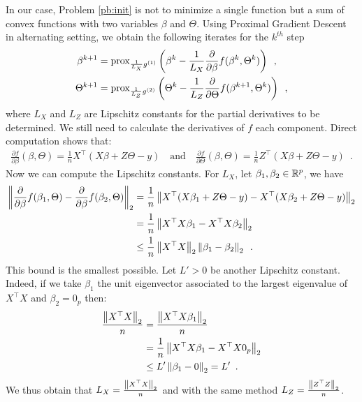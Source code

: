 \documentclass[../main.tex]{subfiles}
\begin{document}
In our case, Problem \eqref{pb:init} is not to minimize a single function but a sum of
convex functions with two variables $\beta$ and $\Theta$.
Using Proximal Gradient Descent \citep{Beck17} in alternating setting,
we obtain the following iterates for the $k^{th}$ step
\begin{align}
	\beta^{k+1}  & =
	\operatorname{prox}_{\frac{1}{L_X}g^{(1)}}
	\left(\beta^k - \frac{1}{L_X}
	\frac{\partial}{\partial \beta}f(\beta^k, \Theta^k)
	\right)\enspace, \\
	\Theta^{k+1} & =
	\operatorname{prox}_{\frac{1}{L_Z}g^{(2)}}
	\left(\Theta^k - \frac{1}{L_Z}
	\frac{\partial}{\partial \Theta}f(\beta^{k+1}, \Theta^k)
	\right)\enspace,
\end{align}
where $L_X$ and $L_Z$ are Lipschitz constants for the partial derivatives
to be determined.
We still need to calculate the derivatives of $f$ \wrt each component.
Direct computation shows that:
\begin{align}
	\frac{\partial f}{\partial \beta}(\beta, \Theta)
	= \frac{1}{n}X^\top (X\beta + Z\Theta - y)
	\quad \text{and} \quad
	\frac{\partial f}{\partial \Theta}(\beta, \Theta)
	= \frac{1}{n}Z^\top (X\beta + Z\Theta -y)
	\enspace.
\end{align}
Now we can compute the Lipschitz constants.
For $L_X$, let $\beta_1,\beta_2\in\mathbb{R}^p$, we have
\begin{align*}
\left \lVert 
	\frac{\partial}{
		\partial \beta}f(\beta_1, \Theta) -
		\frac{\partial}{\partial \beta}
		f(\beta_2, \Theta) \right \rVert_2
	& = \frac{1}{n} \left \lVert  X^\top(X\beta_1 + Z\Theta - y) -
	 X^\top(X\beta_2 + Z\Theta - y)  \right \rVert_2 \\
	& = \frac{1}{n} \left \lVert  X^\top X\beta_1 - X^\top X\beta_2  \right \rVert_2 \\
	& \leq \frac{1}{n} \left \lVert  X^\top X  \right \rVert_2 \left \lVert  \beta_1-\beta_2  \right \rVert_2  \enspace.
\end{align*}
This bound is the smallest possible.
Let $L'>0$ be another Lipschitz constant.
Indeed, if we take $\beta_1$ the unit eigenvector associated to the largest
eigenvalue of $X^\top X$ and $\beta_2=0_p$ then:
\begin{align*}
\frac{\left \lVert X^\top X \right \rVert_2}{n}
& = \frac{\left \lVert X^\top X\beta_1 \right \rVert_2}{n} \\
& = \frac{1}{n}\left \lVert X^\top X \beta_1 - X^\top X 0_p \right \rVert_2 \\
& \leq L' \left \lVert \beta_1 - 0 \right \rVert_2 = L'
\enspace.
\end{align*}
We thus obtain that $L_X = \frac{\left \lVert  X^\top X  \right \rVert_2}{n}$
and with the same method $L_Z = \frac{\left \lVert  Z^\top Z  \right \rVert_2}{n}$.
\end{document}

